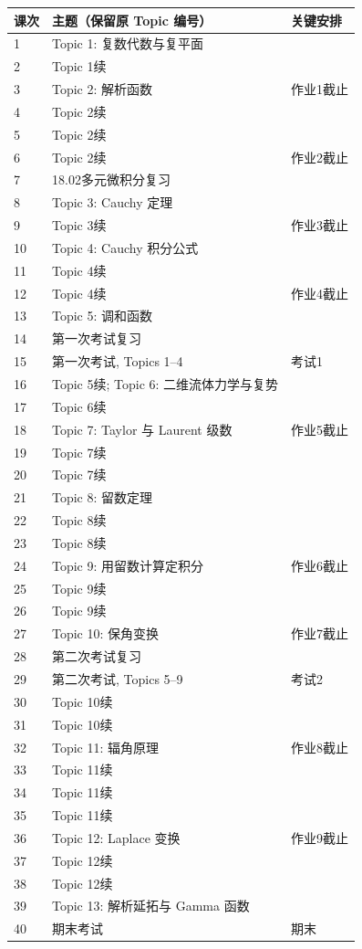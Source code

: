 \begin{longtable}{@{}p{}p{}p{}@{}}
\toprule 课次&主题（保留原 Topic 编号）&关键安排\\\midrule\endhead
1&Topic 1: 复数代数与复平面&\\
2&Topic 1续&\\
3&Topic 2: 解析函数&作业1截止\\
4&Topic 2续&\\
5&Topic 2续&\\
6&Topic 2续&作业2截止\\
7&18.02多元微积分复习&\\
8&Topic 3: Cauchy 定理&\\
9&Topic 3续&作业3截止\\
10&Topic 4: Cauchy 积分公式&\\
11&Topic 4续&\\
12&Topic 4续&作业4截止\\
13&Topic 5: 调和函数&\\
14&第一次考试复习&\\
15&第一次考试, Topics 1--4&考试1\\
16&Topic 5续; Topic 6: 二维流体力学与复势&\\
17&Topic 6续&\\
18&Topic 7: Taylor 与 Laurent 级数&作业5截止\\
19&Topic 7续&\\
20&Topic 7续&\\
21&Topic 8: 留数定理&\\
22&Topic 8续&\\
23&Topic 8续&\\
24&Topic 9: 用留数计算定积分&作业6截止\\
25&Topic 9续&\\
26&Topic 9续&\\
27&Topic 10: 保角变换&作业7截止\\
28&第二次考试复习&\\
29&第二次考试, Topics 5--9&考试2\\
30&Topic 10续&\\
31&Topic 10续&\\
32&Topic 11: 辐角原理&作业8截止\\
33&Topic 11续&\\
34&Topic 11续&\\
35&Topic 11续&\\
36&Topic 12: Laplace 变换&作业9截止\\
37&Topic 12续&\\
38&Topic 12续&\\
39&Topic 13: 解析延拓与 Gamma 函数&\\
40&期末考试&期末\\\bottomrule
\end{longtable}

